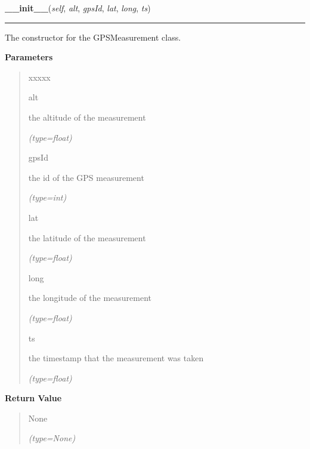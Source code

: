     \vspace{0.5ex}

\hspace{.8\funcindent}\begin{boxedminipage}{\funcwidth}

    \raggedright \textbf{\_\_init\_\_}(\textit{self}, \textit{alt}, \textit{gpsId}, \textit{lat}, \textit{long}, \textit{ts})

    \vspace{-1.5ex}

    \rule{\textwidth}{0.5\fboxrule}
\setlength{\parskip}{2ex}
    The constructor for the GPSMeasurement class.

\setlength{\parskip}{1ex}
      \textbf{Parameters}
      \vspace{-1ex}

      \begin{quote}
        \begin{Ventry}{xxxxx}

          \item[alt]

          the altitude of the measurement

            {\it (type=float)}

          \item[gpsId]

          the id of the GPS measurement

            {\it (type=int)}

          \item[lat]

          the latitude of the measurement

            {\it (type=float)}

          \item[long]

          the longitude of the measurement

            {\it (type=float)}

          \item[ts]

          the timestamp that the measurement was taken

            {\it (type=float)}

        \end{Ventry}

      \end{quote}

      \textbf{Return Value}
    \vspace{-1ex}

      \begin{quote}
      None

      {\it (type=None)}

      \end{quote}

    \end{boxedminipage}


